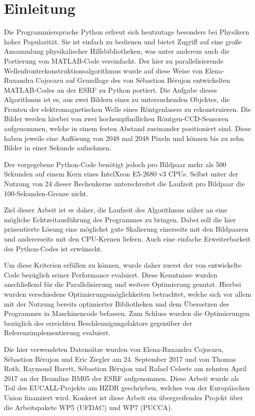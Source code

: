 \chapter{Einleitung}

Die Programmiersprache Python erfreut sich heutzutage besonders bei Physikern hoher Popularität. Sie ist einfach zu bedienen und bietet Zugriff auf eine große Ansammlung physikalischer Hilfsbibliotheken, was unter anderem auch die Portierung von MATLAB-Code vereinfacht. Der hier zu parallelisierende Wellenfrontrekonstruktionsalgorithmus wurde auf diese Weise von Elena-Ruxandra Cojocaru auf Grundlage des von Sébastion Bérujon entwickelten MATLAB-Codes an der \gls{ESRF} zu Python portiert. Die Aufgabe dieses Algorithmus ist es, aus zwei Bildern eines zu untersuchenden Objektes, die Fronten der elektromagnetischen Welle eines Röntgenlasers zu rekonstruieren. Die Bilder werden hierbei von zwei hochempfindlichen Röntgen-CCD-Sensoren aufgenommen, welche in einem festen Abstand zueinander positioniert sind. Diese haben jeweils eine Auflösung von 2048 mal 2048 Pixeln und können bis zu zehn Bilder in einer Sekunde aufnehmen. 

Der vorgegebene Python-Code benötigt jedoch pro Bildpaar mehr als 500 Sekunden auf einem Kern eines Intel\textregistered \mbox{Xeon\textregistered} E5-2680 v3 \glspl{CPU}. Selbst unter der Nutzung von 24 dieser Rechenkerne unterschreitet die Laufzeit pro Bildpaar die 100-Sekunden-Grenze nicht.

Ziel dieser Arbeit ist es daher, die Laufzeit des Algorithmus näher an eine mögliche Echtzeitausführung des Programmes zu bringen. Dabei soll die hier präsentierte Lösung eine möglichst gute Skalierung einerseits mit den Bildpaaren und andererseits mit den \gls{CPU}-Kernen liefern. Auch eine einfache Erweiterbarkeit des Python-Codes ist erwünscht. 

Um diese Kriterien erfüllen zu können, wurde daher zuerst der von \citeauthor{Coj17} entwickelte Code bezüglich seiner Performance evaluiert. Diese Kenntnisse wurden anschließend für die Parallelisierung und weitere Optimierung genutzt. Hierbei wurden verschiedene Optimierungsmöglichkeiten betrachtet, welche sich vor allem mit der Nutzung bereits optimierter Bibliotheken und dem Übersetzen des Programmes in Maschinencode befassen. Zum Schluss wurden die Optimierungen bezüglich des erreichten Beschleunigungsfaktors gegenüber der Referenzimplementierung evaluiert.

Die hier verwendeten Datensätze wurden von Elena-Ruxandra Cojocaru, Sébastion Bérujon und Eric Ziegler am 24. September 2017 und von Thomas Roth, Raymond Barett, Sébastion Bérujon und Rafael Celeste am zehnten April 2017 an der Beamline BM05 der \gls{ESRF} aufgenommen. Diese Arbeit wurde als Teil des \gls{EUCALL}-Projekts am \gls{HZDR} geschrieben, welches von der Europäischen Union finanziert wird. Konkret ist diese Arbeit ein übergreifendes Projekt über die Arbeitspakete WP5 (\gls{UFDAC}) und WP7 (\gls{PUCCA}). 